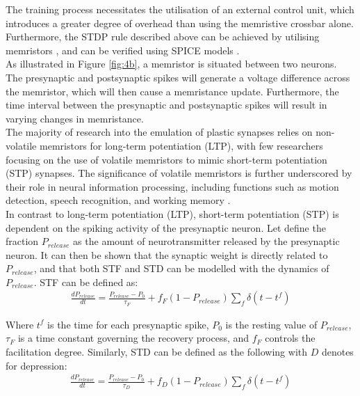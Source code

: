 \noindent The training process necessitates the utilisation of an external control unit, which introduces a greater degree of overhead than using the memristive crossbar alone. Furthermore, the STDP rule described above can be achieved by utilising memristors \cite{maranhao2021low}, and can be verified using SPICE models \cite{yakopcic2013generalized}. \\

\noindent As illustrated in Figure \ref{fig:4b}, a memristor is situated between two neurons. The presynaptic and postsynaptic spikes will generate a voltage difference across the memristor, which will then cause a memristance update. Furthermore, the time interval between the presynaptic and postsynaptic spikes will result in varying changes in memristance. \\

\noindent The majority of research into the emulation of plastic synapses relies on non-volatile memristors for long-term potentiation (LTP), with few researchers focusing on the use of volatile memristors to mimic short-term potentiation (STP) synapses. The significance of volatile memristors is further underscored by their role in neural information processing, including functions such as motion detection, speech recognition, and working memory \cite{ghanbari2017estimating}. \\

\noindent In contrast to long-term potentiation (LTP), short-term potentiation (STP) is dependent on the spiking activity of the presynaptic neuron. Let define the fraction $P_{release}$ as the amount of neurotransmitter released by the presynaptic neuron. It can then be shown that the synaptic weight is directly related to $P_{release}$, and that both STF and STD can be modelled with the dynamics of $P_{release}$. STF can be defined as:
\begin{align}
\frac{dP_{release}}{dt} = \frac{P_{release} - P_0}{\tau_F} + f_F(1 - P_{release})\sum_{f}\delta\left( t- t^f \right) \label{eq:4.10}
\end{align}

\noindent Where $t^f$ is the time for each presynaptic spike, $P_0$ is the resting value of $P_{release}$, $\tau_F$ is a time constant governing the recovery process, and $f_F$ controls the facilitation degree. Similarly, STD can be defined as the following with $D$ denotes for depression:
\begin{align}
\frac{dP_{release}}{dt} = \frac{P_{release} - P_0}{\tau_D} + f_D(1 - P_{release})\sum_{f}\delta\left( t- t^f \right) \label{eq:4.11}
\end{align}

